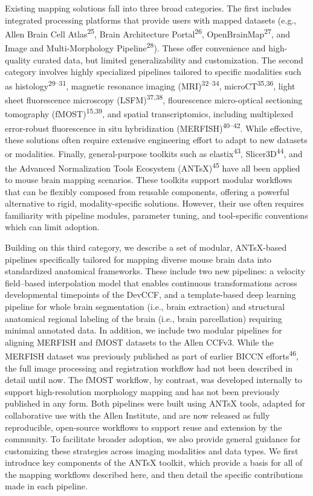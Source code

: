\documentclass[
  12pt,
]{article}
\begin{document}
Existing mapping solutions fall into three broad categories. The first
includes integrated processing platforms that provide users with mapped
datasets (e.g., Allen Brain Cell Atlas\textsuperscript{25}, Brain
Architecture Portal\textsuperscript{26},
OpenBrainMap\textsuperscript{27}, and Image and Multi-Morphology
Pipeline\textsuperscript{28}). These offer convenience and high-quality
curated data, but limited generalizability and customization. The second
category involves highly specialized pipelines tailored to specific
modalities such as histology\textsuperscript{29--31}, magnetic resonance
imaging (MRI)\textsuperscript{32--34}, microCT\textsuperscript{35,36},
light sheet fluorescence microscopy (LSFM)\textsuperscript{37,38},
flourescence micro-optical sectioning tomography
(fMOST)\textsuperscript{15,39}, and spatial transcriptomics, including
multiplexed error-robust fluorescence in situ hybridization
(MERFISH)\textsuperscript{40--42}. While effective, these solutions
often require extensive engineering effort to adapt to new datasets or
modalities. Finally, general-purpose toolkits such as
elastix\textsuperscript{43}, Slicer3D\textsuperscript{44}, and the
Advanced Normalization Tools Ecosystem (ANTsX)\textsuperscript{45} have
all been applied to mouse brain mapping scenarios. These toolkits
support modular workflows that can be flexibly composed from reusable
components, offering a powerful alternative to rigid, modality-specific
solutions. However, their use often requires familiarity with pipeline
modules, parameter tuning, and tool-specific conventions which can limit
adoption.

Building on this third category, we describe a set of modular,
ANTsX-based pipelines specifically tailored for mapping diverse mouse
brain data into standardized anatomical frameworks. These include two
new pipelines: a velocity field--based interpolation model that enables
continuous transformations across developmental timepoints of the
DevCCF, and a template-based deep learning pipeline for whole brain
segmentation (i.e., brain extraction) and structural anatomical regional
labeling of the brain (i.e., brain parcellation) requiring minimal
annotated data. In addition, we include two modular pipelines for
aligning MERFISH and fMOST datasets to the Allen CCFv3. While the
MERFISH dataset was previously published as part of earlier BICCN
efforts\textsuperscript{46}, the full image processing and registration
workflow had not been described in detail until now. The fMOST workflow,
by contrast, was developed internally to support high-resolution
morphology mapping and has not been previously published in any form.
Both pipelines were built using ANTsX tools, adapted for collaborative
use with the Allen Institute, and are now released as fully
reproducible, open-source workflows to support reuse and extension by
the community. To facilitate broader adoption, we also provide general
guidance for customizing these strategies across imaging modalities and
data types. We first introduce key components of the ANTsX toolkit,
which provide a basis for all of the mapping workflows described here,
and then detail the specific contributions made in each pipeline.
\end{document}

